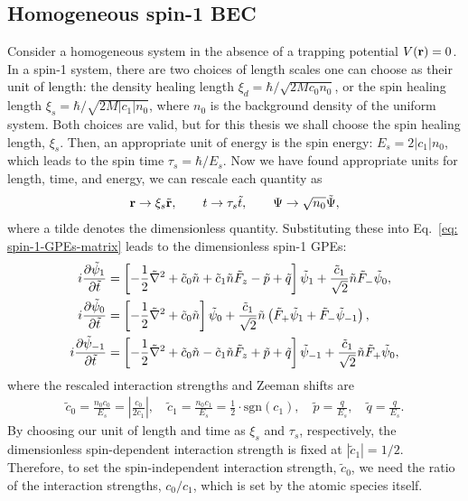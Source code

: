 \subsection{Homogeneous spin-1 BEC}
Consider a homogeneous system in the absence of a trapping potential
\(V(\vb{r}) = 0\).
In a spin-1 system, there are two choices of length scales one
can choose as their unit of length: the density healing length
\(\xi_d=\hbar /\sqrt{2Mc_0n_0}\), or the spin healing length
\(\xi_s = \hbar /\sqrt{2M|c_1|n_0}\), where \(n_0\) is the background density
of the uniform system.
Both choices are valid, but for this thesis we shall choose the spin healing
length, \(\xi_s\).
Then, an appropriate unit of energy is the spin energy: \(E_s = 2|c_1|n_0\),
which leads to the spin time \(\tau_s = \hbar / E_s\).
Now we have found appropriate units for length, time, and energy, we can
rescale each quantity as
\begin{align}
    \vb{r} \rightarrow \xi_s \tilde{\vb{r}}, \qquad
    t \rightarrow \tau_s\tilde{t}, \qquad
    \Psi \rightarrow \sqrt{n_0}\tilde{\Psi},
\end{align}
where a tilde denotes the dimensionless quantity.
Substituting these into Eq.~\eqref{eq: spin-1-GPEs-matrix} leads to the
dimensionless spin-1 GPEs:
\begin{align}
    i \pdv{\tilde{\psi}_{1}}{\tilde{t}} &= \left[-\frac{1}{2}\tilde{\nabla}^2
    + \tilde{c}_0\tilde{n} + \tilde{c}_1\tilde{n}\tilde{F}_z - \tilde{p}
    + \tilde{q}\right]\tilde{\psi}_{1}
    + \frac{\tilde{c}_1}{\sqrt{2}}\tilde{n}\tilde{F}_-\tilde{\psi}_0, \\
    i \pdv{\tilde{\psi}_0}{\tilde{t}} &= \left[-\frac{1}{2}\tilde{\nabla}^2
    + \tilde{c}_0\tilde{n}\right]\tilde{\psi}_0
    + \frac{\tilde{c}_1}{\sqrt{2}}\tilde{n}\left(\tilde{F}_+\tilde{\psi}_1
    + \tilde{F}_-\tilde{\psi}_{-1}\right), \\
    i \pdv{\tilde{\psi}_{-1}}{\tilde{t}} &= \left[-\frac{1}{2}\tilde{\nabla}^2
    + \tilde{c}_0\tilde{n} - \tilde{c}_1\tilde{n}\tilde{F}_z + \tilde{p}
    + \tilde{q}\right]\tilde{\psi}_{-1}
    + \frac{\tilde{c}_1}{\sqrt{2}}\tilde{n}\tilde{F}_+\tilde{\psi}_0,
\end{align}
where the rescaled interaction strengths and Zeeman shifts are
\begin{align}
    \tilde{c}_0 = \frac{n_0c_0}{E_s} = \left|\frac{c_0}{2c_1}\right|, \quad
    \tilde{c}_1 = \frac{n_0c_1}{E_s} = \frac{1}{2} \cdot \text{sgn}(c_1),\quad
    \tilde{p} = \frac{q}{E_s}, \quad
    \tilde{q} = \frac{q}{E_s}.
\end{align}
By choosing our unit of length and time as \(\xi_s\) and \(\tau_s\),
respectively, the dimensionless spin-dependent interaction strength is fixed
at \(|\tilde{c}_1| = 1/2\).
Therefore, to set the spin-independent interaction strength, \(\tilde{c}_0\),
we need the ratio of the interaction strengths, \(c_0/c_1\), which is set by
the atomic species itself.

